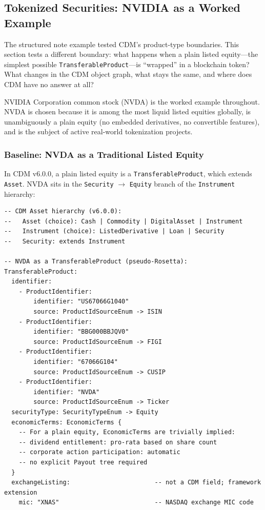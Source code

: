 \documentclass[11pt,a4paper]{article}
\begin{document}
\subsection{Tokenized Securities: NVIDIA as a Worked Example}
\label{sec:cdm-tokenized}

The structured note example tested CDM's product-type boundaries. This section tests a different boundary: what happens when a plain listed equity---the simplest possible \texttt{TransferableProduct}---is ``wrapped'' in a blockchain token? What changes in the CDM object graph, what stays the same, and where does CDM have no answer at all?

NVIDIA Corporation common stock (NVDA) is the worked example throughout. NVDA is chosen because it is among the most liquid listed equities globally, is unambiguously a plain equity (no embedded derivatives, no convertible features), and is the subject of active real-world tokenization projects.

\subsubsection{Baseline: NVDA as a Traditional Listed Equity}
\label{sec:cdm-nvda-baseline}

In CDM v6.0.0, a plain listed equity is a \texttt{TransferableProduct}, which extends \texttt{Asset}. NVDA sits in the \texttt{Security} $\to$ \texttt{Equity} branch of the \texttt{Instrument} hierarchy:

\begin{lstlisting}
-- CDM Asset hierarchy (v6.0.0):
--   Asset (choice): Cash | Commodity | DigitalAsset | Instrument
--   Instrument (choice): ListedDerivative | Loan | Security
--   Security: extends Instrument

-- NVDA as a TransferableProduct (pseudo-Rosetta):
TransferableProduct:
  identifier:
    - ProductIdentifier:
        identifier: "US67066G1040"
        source: ProductIdSourceEnum -> ISIN
    - ProductIdentifier:
        identifier: "BBG000BBJQV0"
        source: ProductIdSourceEnum -> FIGI
    - ProductIdentifier:
        identifier: "67066G104"
        source: ProductIdSourceEnum -> CUSIP
    - ProductIdentifier:
        identifier: "NVDA"
        source: ProductIdSourceEnum -> Ticker
  securityType: SecurityTypeEnum -> Equity
  economicTerms: EconomicTerms {
    -- For a plain equity, EconomicTerms are trivially implied:
    -- dividend entitlement: pro-rata based on share count
    -- corporate action participation: automatic
    -- no explicit Payout tree required
  }
  exchangeListing:                       -- not a CDM field; framework extension
    mic: "XNAS"                          -- NASDAQ exchange MIC code
\end{lstlisting}
\end{document}
